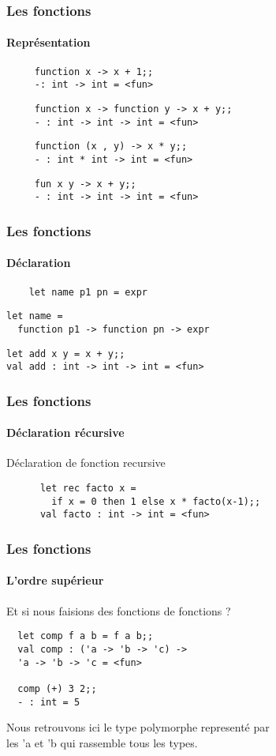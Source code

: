 \begin{frame}[fragile]
	\frametitle{Les fonctions}
	\framesubtitle{Représentation}
	\begin{center}
		\begin{minipage}{10cm}
				\begin{lstlisting}
     function x -> x + 1;;
     -: int -> int = <fun>
				\end{lstlisting}
				\begin{lstlisting}
     function x -> function y -> x + y;;
     - : int -> int -> int = <fun>
				\end{lstlisting}
				\begin{lstlisting}
     function (x , y) -> x * y;;
     - : int * int -> int = <fun>
				\end{lstlisting}
				\begin{lstlisting}
     fun x y -> x + y;;
     - : int -> int -> int = <fun>
				\end{lstlisting}
		\end{minipage}
  \end{center}
\end{frame}

\begin{frame}[fragile]
	\frametitle{Les fonctions}
  	\framesubtitle{Déclaration}
    	\begin{lstlisting}
	let name p1 pn = expr
    	\end{lstlisting}
	\begin{lstlisting}
let name = 
  function p1 -> function pn -> expr
  	\end{lstlisting}
  	\vspace{0.4cm}
  	\begin{lstlisting}
let add x y = x + y;;
val add : int -> int -> int = <fun>
  	\end{lstlisting}
\end{frame}

\begin{frame}[fragile]
	\frametitle{Les fonctions}
	\framesubtitle{Déclaration récursive}
	\begin{block}{Déclaration de fonction recursive} 
	  \begin{lstlisting}
	  let rec facto x = 
	  	if x = 0 then 1 else x * facto(x-1);;
	  val facto : int -> int = <fun>
	  \end{lstlisting}
	\end{block}
\end{frame}

\begin{frame}[fragile]
	\frametitle{Les fonctions}
  	\framesubtitle{L'ordre supérieur}
  	Et si nous faisions des fonctions de fonctions ? 
 	\begin{lstlisting}
  let comp f a b = f a b;;
  val comp : ('a -> 'b -> 'c) -> 
  'a -> 'b -> 'c = <fun>
  
  comp (+) 3 2;;
  - : int = 5
 	\end{lstlisting}
	Nous retrouvons ici le type polymorphe representé par\\
	les 'a et 'b qui rassemble tous les types.
\end{frame}

